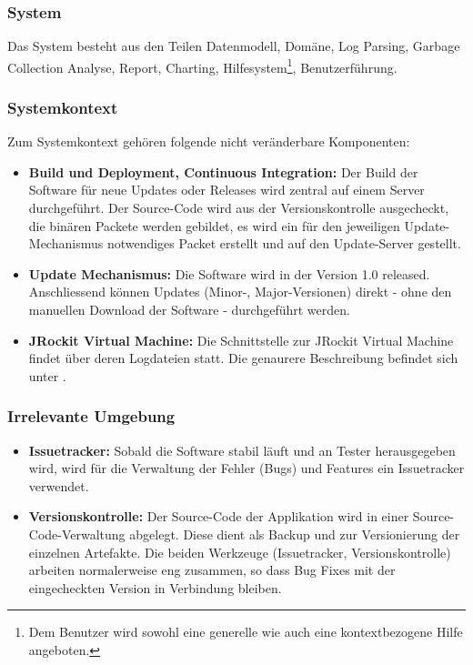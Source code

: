 \subsubsection{System}
Das System besteht aus den Teilen Datenmodell, Domäne, Log Parsing, Garbage Collection Analyse, Report, Charting, Hilfesystem\footnote{Dem Benutzer wird sowohl eine generelle wie auch eine kontextbezogene Hilfe angeboten.}, Benutzerführung.

\subsubsection{Systemkontext}
Zum Systemkontext gehören folgende nicht veränderbare Komponenten:
\begin{itemize}
	\item \textbf{Build und Deployment, Continuous Integration:} Der Build der Software für neue Updates oder Releases wird zentral auf einem Server durchgeführt. Der Source-Code wird aus der Versionskontrolle ausgecheckt, die binären Packete werden gebildet, es wird ein für den jeweiligen Update-Mechanismus notwendiges Packet erstellt und auf den Update-Server gestellt.

	\item \textbf{Update Mechanismus:} Die Software wird in der Version 1.0 released. Anschliessend können Updates (Minor-, Major-Versionen) direkt - ohne den manuellen Download der Software - durchgeführt werden.
	\item \textbf{JRockit Virtual Machine:} Die Schnittstelle zur JRockit Virtual Machine findet über deren Logdateien statt. Die genaurere Beschreibung befindet sich unter .
\end{itemize}

\subsubsection{Irrelevante Umgebung}
\begin{itemize}
	\item \textbf{Issuetracker:} Sobald die Software stabil läuft und an Tester herausgegeben wird, wird für die Verwaltung der Fehler (Bugs) und Features ein Issuetracker verwendet.
	\item \textbf{Versionskontrolle:} Der Source-Code der Applikation wird in einer Source-Code-Verwaltung abgelegt. Diese dient als Backup und zur Versionierung der einzelnen Artefakte. Die beiden Werkzeuge (Issuetracker, Versionskontrolle) arbeiten normalerweise eng zusammen, so dass Bug Fixes mit der eingecheckten Version in Verbindung bleiben.
\end{itemize}


